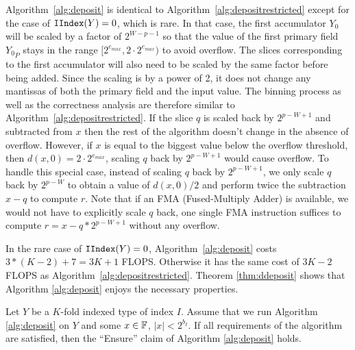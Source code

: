       Algorithm~\ref{alg:deposit} is identical to Algorithm~\ref{alg:depositrestricted} except
      for the case of $\mathtt{IIndex}(Y) = 0$, which is rare.
      In that case, the first accumulator $Y_0$ will be scaled by a factor of $2^{W-p-1}$
      so that the value of the first primary field ${Y_0}_P$ stays in the range
      $[2^{e_{max}}, 2 \cdot 2^{e_{max}})$ to avoid overflow.
      The slices corresponding to the first accumulator will also need to be scaled
      by the same factor before being added.
      Since the scaling is by a power of 2, it does not change any mantissas
      of both the primary field and the input value.
      The binning process as well as the correctness analysis
      are therefore similar to Algorithm~\ref{alg:depositrestricted}.
      If the slice $q$ is scaled back by $2^{p-W+1}$ and subtracted from $x$
      then the rest of the algorithm doesn't change in the absence of overflow.
      However, if $x$ is equal to the biggest value below the overflow threshold,
      then $d(x,0) = 2\cdot 2^{e_{max}}$,
      scaling $q$ back by $2^{p-W+1}$ would cause overflow.
      To handle this special case, instead of scaling $q$ back by $2^{p-W+1}$,
      we only scale $q$ back by $2^{p-W}$ to obtain a value of $d(x,0)/2$
      and perform twice the subtraction $x-q$ to compute $r$.
      Note that if an FMA (Fused-Multiply Adder) is available,
      we would not have to explicitly scale $q$ back,
      one single FMA instruction suffices to compute $r = x - q * 2^{p-W+1}$
      without any overflow.

      In the rare case of $\mathtt{IIndex}(Y) = 0$, Algorithm~\ref{alg:deposit}
      costs $3 * (K-2) + 7 = 3K+1$ FLOPS. Otherwise it has the same cost
      of $3K-2$ FLOPS as Algorithm~\ref{alg:depositrestricted}.
      Theorem \ref{thm:ddeposit} shows that Algorithm \ref{alg:deposit}
      enjoys the necessary properties.

      \begin{samepage}
      \begin{thm}
        Let $Y$ be a $K$-fold indexed type of index $I$. Assume that we run
        Algorithm \ref{alg:deposit} on $Y$ and some $x \in \mathbb{F}$, $|x|<2^{b_I}$.
        If all requirements of the algorithm are satisfied, then the
        ``Ensure'' claim of Algorithm \ref{alg:deposit} holds.
        \label{thm:ddeposit}
      \end{thm}
    \end{samepage}

